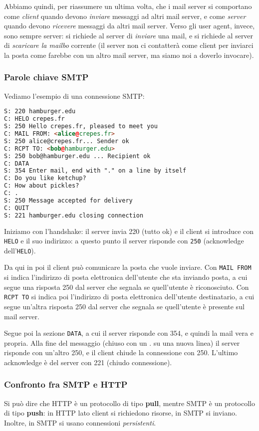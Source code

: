 \documentclass[a4paper,11pt]{article}
\begin{document}
Abbiamo quindi, per riassumere un ultima volta, che i mail server si comportano come \textit{client} quando devono \textit{inviare} messaggi ad altri mail server, e come \textit{server} quando devono \textit{ricevere} messaggi da altri mail server.
Verso gli user agent, invece, sono sempre server: si richiede al server di \textit{inviare} una mail, e si richiede al server di \textit{scaricare la mailbo} corrente (il server non ci contatterà come client per inviarci la posta come farebbe con un altro mail server, ma siamo noi a doverlo invocare). 

\subsubsection{Parole chiave SMTP}
Vediamo l'esempio di una connessione SMTP:
\begin{lstlisting}[language=html, style=codestyle]	
S: 220 hamburger.edu
C: HELO crepes.fr
S: 250 Hello crepes.fr, pleased to meet you
C: MAIL FROM: <alice@crepes.fr>
S: 250 alice@crepes.fr... Sender ok
C: RCPT TO: <bob@hamburger.edu>
S: 250 bob@hamburger.edu ... Recipient ok
C: DATA
S: 354 Enter mail, end with "." on a line by itself
C: Do you like ketchup?
C: How about pickles?
C: .
S: 250 Message accepted for delivery
C: QUIT
S: 221 hamburger.edu closing connection
\end{lstlisting}

Iniziamo con l'handshake: il server invia 220 (tutto ok) e il client si introduce con \lstinline|HELO| e il suo indirizzo: a questo punto il server risponde con \lstinline|250| (acknowledge dell'\lstinline|HELO|).

Da qui in poi il client può comunicare la posta che vuole inviare.
Con \lstinline|MAIL FROM| si indica l'indirizzo di posta elettronica dell'utente che sta inviando posta, a cui segue una risposta 250 dal server che segnala se quell'utente è riconosciuto. 
Con \lstinline|RCPT TO| si indica poi l'indirizzo di posta elettronica dell'utente destinatario, a cui segue un'altra risposta 250 dal server che segnala se quell'utente è presente sul mail server. 

Segue poi la sezione \lstinline|DATA|, a cui il server risponde con 354, e quindi la mail vera e propria.
Alla fine del messaggio (chiuso con un . su una nuova linea) il server risponde con un'altro 250, e il client chiude la connessione con 250. L'ultimo acknowledge è del server con 221 (chiudo connessione).

\subsubsection{Confronto fra SMTP e HTTP}
Si può dire che HTTP è un protocollo di tipo \textbf{pull}, mentre SMTP è un protocollo di tipo \textbf{push}: in HTTP lato client si richiedono risorse, in SMTP si inviano.
Inoltre, in SMTP si usano connessioni \textit{persistenti}.
\end{document}
